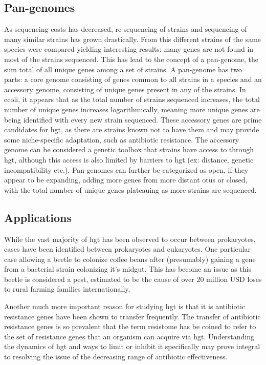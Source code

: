 \documentclass[12pt,letter]{article}
\begin{document}
\subsection{Pan-genomes}%
As sequencing costs has decreased, re-sequencing of strains and sequencing of many similar strains has grown drastically.
From this different strains of the same species were compared yielding interesting results: many genes are not found in most of the strains sequenced\citep{toolpan}.
This has lead to the concept of a pan-genome, the sum total of all unique genes among a set of strains\citep{pang}.
A pan-genome has two parts: a core genome consisting of genes common to all strains in a species and an accessory genome, consisting of unique genes present in any of the strains\citep{pang}.
In \ac{ecoli}, it appears that as the total number of strains sequenced increases, the total number of unique genes increases logarithmically, meaning more unique genes are being identified with every new strain sequenced\citep{ecopan}.
These accessory genes are prime candidates for \ac{hgt}, as there are strains known not to have them and may provide some niche-specific adaptation, such as antibiotic resistance\citep{pang}.
The accessory genome can be considered a genetic toolbox that strains have access to through \ac{hgt}, although this access is also limited by barriers to \ac{hgt} (ex: distance, genetic incompatibility etc.).
Pan-genomes can further be categorized as open, if they appear to be expanding, adding more genes from more distant \ac{otu}s or closed, with the total number of unique genes plateauing as more strains are sequenced\citep{pang}.
\subsection{Applications}
While the vast majority of \ac{hgt} has been observed to occur between prokaryotes, cases have been identified between prokaryotes and eukaryotes.
One particular case allowing a beetle to colonize coffee beans after (presumably) gaining a gene from a bacterial strain colonizing it's midgut\citep{beetle}.
This has become an issue as this beetle is considered a pest, estimated to be the cause of over $20$ million USD loses to rural farming families internationally\citep{beetle}.\par
Another much more important reason for studying \ac{hgt} is that it is antibiotic resistance genes have been shown to transfer frequently\citep{amrhgt}.
The transfer of antibiotic resistance genes is so prevalent that the term resistome has be coined to refer to the set of resistance genes that an organism can acquire via \ac{hgt}\citep{amrhgt}.
Understanding the dynamics of \ac{hgt} and ways to limit or inhibit it specifically may prove integral to resolving the issue of the decreasing range of antibiotic effectiveness\citep{amrhgt}.
\end{document}
